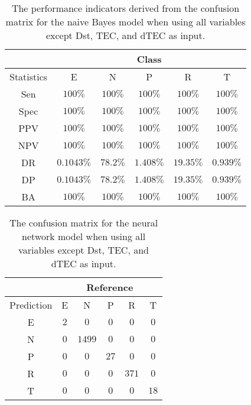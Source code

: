 \begin{table}[!ht]
	\centering
	\begin{tabular}{|c|c|c|c|c|c|}
		\hline
		 & \multicolumn{5}{c|}{Class} \\ \hline
		Statistics & E & N & P & R & T \\ \hline
		Sen & $100\%$ & $100\%$ & $100\%$ & $100\%$ & $100\%$ \\ \hline
		Spec & $100\%$ & $100\%$ & $100\%$ & $100\%$ & $100\%$ \\ \hline
		PPV & $100\%$ & $100\%$ & $100\%$ & $100\%$ & $100\%$ \\ \hline
		NPV & $100\%$ & $100\%$ & $100\%$ & $100\%$ & $100\%$ \\ \hline
		DR & $0.1043\%$ & $78.2\%$ & $1.408\%$ & $19.35\%$ & $0.939\%$ \\ \hline
		DP & $0.1043\%$ & $78.2\%$ & $1.408\%$ & $19.35\%$ & $0.939\%$ \\ \hline
		BA & $100\%$ & $100\%$ & $100\%$ & $100\%$ & $100\%$ \\ \hline
	\end{tabular}
	\caption{The performance indicators derived from the confusion matrix for the naive Bayes model when using all variables except Dst, TEC, and dTEC as input.}
	\label{tab:cs:reverse:noTEC:nb}
\end{table}

\begin{table}[!ht]
	\centering
	\begin{tabular}{|c|c|c|c|c|c|}
		\hline
		 & \multicolumn{5}{|c|}{Reference} \\ \hline
		 Prediction & E & N & P & R & T \\ \hline
		 E & $2$ & $0$ & $0$ & $0$ & $0$ \\ \hline
		 N & $0$ & $1499$ & $0$ & $0$ & $0$ \\ \hline
		 P & $0$ & $0$ & $27$ & $0$ & $0$ \\ \hline
		 R & $0$ & $0$ & $0$ & $371$ & $0$ \\ \hline
		 T & $0$ & $0$ & $0$ & $0$ & $18$ \\ \hline
	\end{tabular}
	\caption{The confusion matrix for the neural network model when using all variables except Dst, TEC, and dTEC as input.}
	\label{tab:cm:noTEC:nnet}
\end{table}

